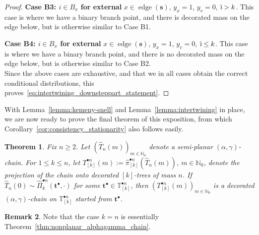 \documentclass[a4paper, final]{amsart}
\theoremstyle{plain}
\newtheorem{thm}{Theorem}[section]
\theoremstyle{definition}
\newtheorem{rem}[thm]{Remark}
\newcommand{\tree}[1][t]{\boldsymbol{#1}}
\newcommand{\That}[1][T]{\widehat{#1}}
\newcommand{\T}{\mathbb{T}}
\DeclareMathOperator{\edge}{edge}
\DeclareMathOperator{\tildei}{\tilde{\textit{\i}}}
\newcommand{\N}{\mathbb{N}}
\begin{document}
\begin{proof}
\textbf{Case B3: $i \in B_x$ for external} $x \in \edge (\tree[s])$, $y_x = 1$, $y_v = 0$, $\tildei > k$.
  This case is where we have a binary branch point, and there is decorated mass on the edge below, but is otherwise similar to Case B1.
  
\textbf{Case B4: $i \in B_x$ for external} $x \in \edge (\tree[s])$, $y_x = 1$, $y_v = 0$, $\tildei \leq k$.
  This case is where we have a binary branch point, and there is no decorated mass on the edge below, but is otherwise similar to Case B2. \\

  Since the above cases are exhaustive, and that we in all cases obtain the correct conditional distributions, this proves~\eqref{eq:intertwining_downsteppart_statement}.
\end{proof}
%
%
With Lemma~\ref{lemma:kemeny-snell} and Lemma~\ref{lemma:intertwining} in place, we are now ready to prove the final theorem of this exposition, from which Corollary~\ref{cor:consistency_stationarity} also follows easily.
%
\begin{thm}\label{thm:decorated_chain_projection_theorem}
  Fix $n \geq 2$.
  Let ${( \That_n(m) )}_{m \in \N_0}$ denote a semi-planar $(\alpha, \gamma)$-chain.
  For $1 \leq k \leq n$, let $T_{[k]}^{\bullet n}(m) := \hat{\pi}_{[k]}^{\bullet n} \left( \That_n(m) \right)$, $m \in \N_0$, denote the projection of the chain onto decorated $[k]$-trees of mass $n$.
  If $\That_n(0) \sim \hat{\Pi}_k^{\bullet n} (\tree^\bullet, \cdot)$ for some $\tree^\bullet \in \T_{[k]}^{\bullet n}$, then ${\left( T_{[k]}^{\bullet n}( m ) \right)}_{m \in \N_0}$ is a decorated $(\alpha, \gamma)$-chain on $\T_{[k]}^{\bullet n}$ started from $\tree^\bullet$.
\end{thm}
%
\begin{rem}
  Note that the case $k = n$ is essentially Theorem~\ref{thm:nonplanar_alphagamma_chain}.
\end{rem}
%
\end{document}
